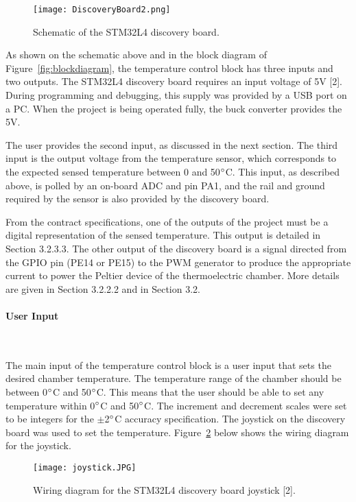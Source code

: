 \documentclass[11pt,letter]{article}
\begin{document}
\begin{figure}[H]
    \centering
    \texttt{[image: DiscoveryBoard2.png]}
    \caption{Schematic of the STM32L4 discovery board.}
    \label{fig:discovery}
\end{figure}

As shown on the schematic above and in the block diagram of Figure~\ref{fig:blockdiagram}, the temperature control block has three inputs and two outputs. The STM32L4 discovery board requires an input voltage of 5V [2]. During programming and debugging, this supply was provided by a USB port on a PC. When the project is being operated fully, the buck converter provides the 5V. 

The user provides the second input, as discussed in the next section. The third input is the output voltage from the temperature sensor, which corresponds to the expected sensed temperature between 0 and 50$\degree$C. This input, as described above, is polled by an on-board ADC and pin PA1, and the rail and ground required by the sensor is also provided by the discovery board. 

From the contract specifications, one of the outputs of the project must be a digital representation of the sensed temperature. This output is detailed in Section 3.2.3.3. The other output of the discovery board is a signal directed from the GPIO pin (PE14 or PE15) to the PWM generator to produce the appropriate current to power the Peltier device of the thermoelectric chamber. More details are given in Section 3.2.2.2 and in Section 3.2.

\paragraph{User Input} \

The main input of the temperature control block is a user input that sets the desired chamber temperature. The temperature range of the chamber should be between 0$\degree$C and 50$\degree$C. This means that the user should be able to set any temperature within 0$\degree$C and 50$\degree$C. The increment and decrement scales were set to be integers for the $\pm$2$\degree$C accuracy specification. The joystick on the discovery board was used to set the temperature. Figure~\ref{fig:joystick} below shows the wiring diagram for the joystick.

\begin{figure}[H]
    \centering
    \texttt{[image: joystick.JPG]}
    \caption{Wiring diagram for the STM32L4 discovery board joystick [2].}
    \label{fig:joystick}
\end{figure}
\end{document}
